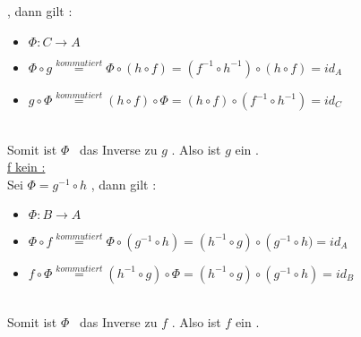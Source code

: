 \documentclass{article}
\begin{document}
		, dann gilt :
		\begin{itemize}
			\item 
				\begin{math}
					\Phi : C \to A
				\end{math}
			\item
				\begin{math}
					\Phi \circ g \overset{ kommutiert}{=}
					\Phi \circ \left( 
						h \circ f  
						\right) =
					\left( f^{-1} \circ h^{-1} \right) 
					\circ 
					\left( h \circ f  \right)= 
					id_{A}
				\end{math}
			\item
				\begin{math}
					g \circ \Phi \overset{ kommutiert}{=}
					\left( 
						h \circ f
 						\right) \circ \Phi =
					\left( h \circ f  \right)
					\circ
					\left( f^{-1} \circ h^{-1} \right)=
					id_{C}
				\end{math}
		\end{itemize}
		\\
		Somit ist 
		\begin{math}
			\Phi
		\end{math}
		\ das Inverse zu 
		\begin{math}
			g
		\end{math}
		. 
		Also ist 
		\begin{math}

			g
		\end{math}
		ein \Iso. 
		\\
		\underline {f kein \Iso :}
		\\
		Sei 
		\begin{math}
			\Phi=g^{-1} \circ h
		\end{math}		
		, dann gilt :
		\begin{itemize}
			\item 
				\begin{math}
					\Phi : B \to A
				\end{math}
			\item
				\begin{math}
					\Phi \circ f \overset{ kommutiert}{=}
					\Phi \circ \left( 
						g^{-1} \circ h  
						\right) =
					\left(  h^{-1} \circ g \right) 
					\circ 
					\left( g^{-1} \circ h )= 
					id_{A}
				\end{math}
			\item
				\begin{math}
					f \circ \Phi \overset{ kommutiert}{=}
					\left( 
						h^{-1} \circ g
 						\right) \circ \Phi =
					\left(h^{-1} \circ g \right)
					\circ
					\left( g^{-1} \circ h  \right)=
					id_{B}
				\end{math}
		\end{itemize}
		\\
		Somit ist 
		\begin{math}
			\Phi
		\end{math}
		\ das Inverse zu 
		\begin{math}
			f
		\end{math}
		. 
		Also ist 
		\begin{math}
			f
		\end{math}
		ein \Iso. 
		\\
		
\end{document}
